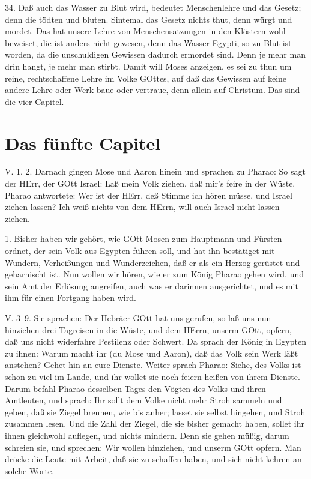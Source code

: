 34. Daß auch das Wasser zu Blut wird, bedeutet Menschenlehre und das Gesetz; denn die tödten und bluten. Sintemal das Gesetz nichts thut, denn würgt und mordet. Das hat unsere Lehre von Menschensatzungen in den Klöstern wohl beweiset, die ist anders nicht gewesen, denn das Wasser Egypti, so zu Blut ist worden, da die unschuldigen Gewissen dadurch ermordet sind. Denn je mehr man drin hangt, je mehr man stirbt. Damit will Moses anzeigen, es sei zu thun um reine, rechtschaffene Lehre im Volke GOttes, auf daß das Gewissen auf keine andere Lehre oder Werk baue oder vertraue, denn allein auf Christum. Das sind die vier Capitel.

\section{Das fünfte Capitel}

\begin{schriftzitat}
V. 1. 2. Darnach gingen Mose und Aaron hinein und sprachen zu Pharao: So sagt der HErr, der GOtt Israel: Laß mein Volk ziehen, daß mir's feire in der Wüste. Pharao antwortete: Wer ist der HErr, deß Stimme ich hören müsse, und Israel ziehen lassen? Ich weiß nichts von dem HErrn, will auch Israel nicht lassen ziehen.
\end{schriftzitat}

1. Bisher haben wir gehört, wie GOtt Mosen zum Hauptmann und Fürsten ordnet, der sein Volk aus Egypten führen soll, und hat ihn bestätiget mit Wundern, Verheißungen und Wunderzeichen, daß er als ein Herzog gerüstet und geharnischt ist. Nun wollen wir hören, wie er zum König Pharao gehen wird, und sein Amt der Erlösung angreifen, auch was er darinnen ausgerichtet, und es mit ihm für einen Fortgang haben wird.

\begin{schriftzitat}
V. 3–9. Sie sprachen: Der Hebräer GOtt hat uns gerufen, so laß uns nun hinziehen drei Tagreisen in die Wüste, und dem HErrn, unserm GOtt, opfern, daß uns nicht widerfahre Pestilenz oder Schwert. Da sprach der König in Egypten zu ihnen: Warum macht ihr (du Mose und Aaron), daß das Volk sein Werk läßt anstehen? Gehet hin an eure Dienste. Weiter sprach Pharao: Siehe, des Volks ist schon zu viel im Lande, und ihr wollet sie noch feiern heißen von ihrem Dienste. Darum befahl Pharao desselben Tages den Vögten des Volks und ihren Amtleuten, und sprach: Ihr sollt dem Volke nicht mehr Stroh sammeln und geben, daß sie Ziegel brennen, wie bis anher; lasset sie selbst hingehen, und Stroh zusammen lesen. Und die Zahl der Ziegel, die sie bisher gemacht haben, sollet ihr ihnen gleichwohl auflegen, und nichts mindern. Denn sie gehen müßig, darum schreien sie, und sprechen: Wir wollen hinziehen, und unserm GOtt opfern. Man drücke die Leute mit Arbeit, daß sie zu schaffen haben, und sich nicht kehren an solche Worte.
\end{schriftzitat}

